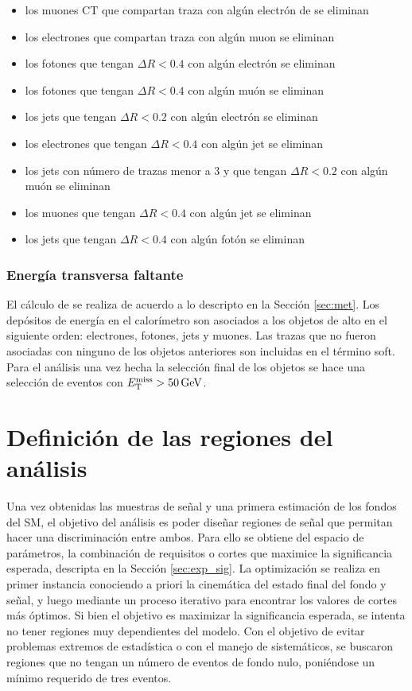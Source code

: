 \begin{itemize}
  \item los muones CT que compartan traza con algún electrón de se eliminan
  \item los electrones que compartan traza con algún muon se eliminan
  \item los fotones que tengan $\Delta R<0.4$ con algún electrón se eliminan
  \item los fotones que tengan $\Delta R<0.4$ con algún muón se eliminan
  \item los jets que tengan $\Delta R<0.2$ con algún electrón se eliminan
  \item los electrones que tengan $\Delta R<0.4$ con algún jet se eliminan
  \item los jets con número de trazas menor a 3 y que tengan $\Delta R<0.2$ con algún muón se eliminan
  \item los muones que tengan $\Delta R<0.4$ con algún jet se eliminan
  \item los jets que tengan $\Delta R<0.4$ con algún fotón se eliminan
\end{itemize}


\subsubsection{Energía transversa faltante}

El cálculo de \met se realiza de acuerdo a lo descripto en la Sección \ref{sec:met}. Los depósitos de energía en el calorímetro son asociados a los objetos de alto \pt en el siguiente orden: electrones, fotones, jets y muones. Las trazas que no fueron asociadas con ninguno de los objetos anteriores son incluidas en el término soft. Para el análisis una vez hecha la selección final de los objetos se hace una selección de eventos con $E_{\text{T}}^{\text{miss}}>50\,\text{GeV}$.


\section{Definición de las regiones del análisis}

Una vez obtenidas las muestras de señal y una primera estimación de los fondos del SM, el objetivo del análisis es poder diseñar regiones de señal que permitan hacer una discriminación entre ambos. Para ello se obtiene del espacio de parámetros, la combinación de requisitos o cortes que maximice la significancia esperada, descripta en la Sección \ref{sec:exp_sig}.
La optimización se realiza en primer instancia conociendo a priori la cinemática del estado final del fondo y señal, y luego mediante un proceso iterativo para encontrar los valores de cortes más óptimos. Si bien el objetivo es maximizar la significancia esperada, se intenta no tener regiones muy dependientes del modelo. Con el objetivo de evitar problemas extremos de estadística o con el manejo de sistemáticos, se buscaron regiones que no tengan un número de eventos de fondo nulo, poniéndose un mínimo requerido de tres eventos. 

